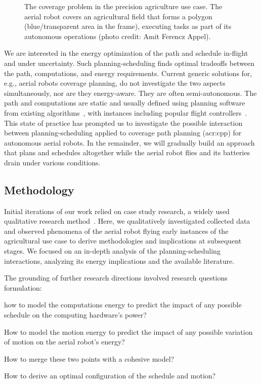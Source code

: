 \begin{figure}[ht!]
  \centering
  
  \caption[The coverage problem in a precision agriculture use case]{The coverage problem in the precision agriculture use case. The aerial robot covers an agricultural field that forms a polygon (blue/transparent area in the frame), executing tasks as part of its autonomous operations {\scriptsize(photo credit: Amit Ferencz Appel)}.}
  \label{fig:plot2}
\end{figure}
We are interested in the energy optimization of the path and schedule in-flight and under uncertainty. Such planning-scheduling finds optimal tradeoffs between the path, computations, and energy requirements. Current generic solutions for, e.g., aerial robots coverage planning, do not investigate the two aspects simultaneously, nor are they energy-aware. They are often semi-autonomous. The path and computations are static and usually defined using planning software~\citep{daponte2019review} from existing algorithms~\citep{choset2001coverage,galceran2013survey}, with instances including popular flight controllers~\citep{px4,papa}. This state of practice has prompted us to investigate the possible interaction between planning-scheduling applied to coverage path planning (\Gls{acr:cpp}) for autonomous aerial robots. In the remainder, we will gradually build an approach that plans and schedules altogether while the aerial robot flies and its batteries drain under various conditions.

\subsection{Methodology}
\label{sec:methodology}

Initial iterations of our work relied on case study research, a widely used qualitative research method~\citep{darke1998successfully}. Here, we qualitatively investigated collected data and observed phenomena of the aerial robot flying early instances of the agricultural use case to derive methodologies and implications at subsequent stages. We focused on an in-depth analysis of the planning-scheduling interactions, analyzing its energy implications and the available literature. 

The grounding of further research directions involved research questions formulation: 
\begin{enumerate*}[label={(\alph*)},font={\textit}]
  \item how to model the computations energy to predict the impact of any possible schedule on the computing hardware's power? 
  \item How to model the motion energy to predict the impact of any possible variation of motion on the aerial robot's energy? 
  \item How to merge these two points with a cohesive model? 
  \item How to derive an optimal configuration of the schedule and motion?
\end{enumerate*} 

